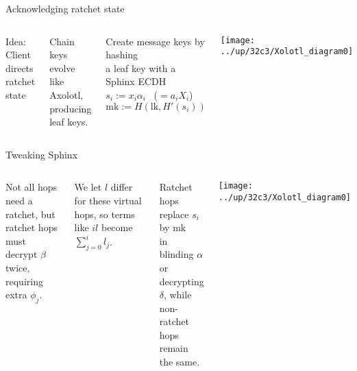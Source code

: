 \documentclass[fleqn,xcolor={usenames,dvipsnames}]{beamer}
\begin{document}
\begin{frame}[t]{Acknowledging ratchet state}
\begin{columns}[T]
Idea: Client directs ratchet state

\bigskip
Chain keys evolve like Axolotl, 
 \hspace*{2pt} producing leaf keys. %

\smallskip
Create message keys by hashing \\
 \hspace*{2pt} a leaf key with a Sphinx ECDH \\ %
 \hspace*{10pt} $s_i := x_i \alpha_i$ \  ($= a_i X_i$) \\
\smallskip
 \hspace*{10pt} $\textrm{mk} := H(\textrm{lk},H'(s_i))$

\medskip
{}

\texttt{[image: ../up/32c3/Xolotl\_diagram0]}
\end{columns}
\end{frame}


\begin{frame}[t]{Tweaking Sphinx}
\begin{columns}[T]

Not all hops need a ratchet, but \\
 \hspace*{1pt} ratchet hops must decrypt $\beta$ twice,
 \hspace*{1pt} requiring extra $\phi_j$. 

\medskip

We let $l$ differ for these virtual hops,
 \hspace*{1pt} so terms like $i l$ become $\sum_{j=0}^i l_j$.

\medskip

Ratchet hops replace $s_i$ by $\textrm{mk}$ \\
 \hspace*{1pt} in blinding $\alpha$ or decrypting $\delta$, while \\
 \hspace*{1pt} non-ratchet hops remain the same.

\texttt{[image: ../up/32c3/Xolotl\_diagram0]}
\end{columns}
\end{frame}
\end{document}
